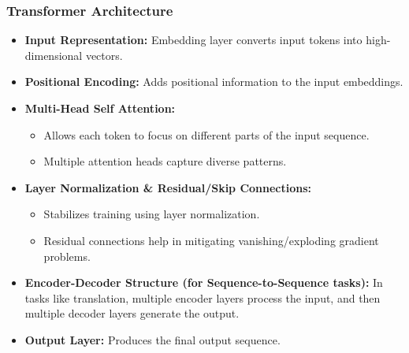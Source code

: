 \begin{frame}[fragile]\frametitle{Transformer Architecture}

  \begin{itemize}
    \item \textbf{Input Representation:} Embedding layer converts input tokens into high-dimensional vectors.


    \item \textbf{Positional Encoding:} Adds positional information to the input embeddings.


    \item \textbf{Multi-Head Self Attention:}
      \begin{itemize}
        \item Allows each token to focus on different parts of the input sequence.
        \item Multiple attention heads capture diverse patterns.
      \end{itemize}

    \item \textbf{Layer Normalization \& Residual/Skip Connections:}
      \begin{itemize}
        \item Stabilizes training using layer normalization.
        \item Residual connections help in mitigating vanishing/exploding gradient problems.
      \end{itemize}

    \item \textbf{Encoder-Decoder Structure (for Sequence-to-Sequence tasks):} In tasks like translation, multiple encoder layers process the input, and then multiple decoder layers generate the output.

    \item \textbf{Output Layer:} Produces the final output sequence.
  \end{itemize}

\end{frame}

